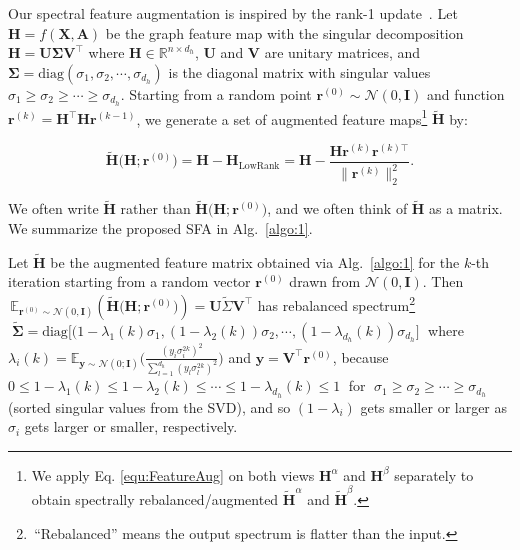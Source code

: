 Our spectral feature augmentation is inspired by the rank-1 update~\cite{yu2020toward}. %
Let  $\mathbf{H} = f(\mathbf{X}, \mathbf{A})$ be the graph feature map with the singular decomposition  $\mathbf{H} = \mathbf{U}\mathbf{\Sigma}\mathbf{V}^\top$ where $\mathbf{H} \in \mathbb{R}^{n \times d_h}$,  $\mathbf{U}$ and $\mathbf{V}$ are unitary matrices, and $\mathbf{\Sigma} = \text{diag}(\sigma_1, \sigma_2,\cdots, \sigma_{d_h})$ is the diagonal matrix with  singular values $\sigma_1 \geq \sigma_2 \geq \cdots \geq \sigma_{d_h}$.
Starting from a random point $\mathbf{r}^{(0)} \sim \mathcal{N}(0,\mathbf{I})$ and  function $\mathbf{r}^{(k)} = \mathbf{H}^\top \mathbf{H} \mathbf{r}^{(k-1)}$,
we generate a set of augmented feature maps\footnote{We apply Eq. \eqref{equ:FeatureAug} on both views $\mathbf{H}^\alpha$ and $\mathbf{H}^\beta$ separately to obtain spectrally rebalanced/augmented  $\widetilde{\mathbf{H}}^\alpha$ and $\widetilde{\mathbf{H}}^\beta$.} $\widetilde{\mathbf{H}}$ by:
%

\vspace{-0.4cm}
\begin{equation}
\label{equ:FeatureAug}
    \widetilde{\mathbf{H}}\big(\mathbf{H}; \mathbf{r}^{(0)}\big) =\mathbf{H} - \mathbf{H}_{\text{LowRank}} =  \mathbf{H} - \frac{\mathbf{H} \mathbf{r}^{(k)} \mathbf{r}^{(k)\top}}{\|\mathbf{r}^{(k)}\|_2^2}.
\end{equation}
\vspace{-0.2cm}
%

\noindent 
We often write $\widetilde{\mathbf{H}}$ rather than $\widetilde{\mathbf{H}}\big(\mathbf{H}; \mathbf{r}^{(0)}\big)$, and we often think of  $\widetilde{\mathbf{H}}$ as a matrix. We summarize the proposed SFA in Alg.~\ref{algo:1}.
\begin{proposition}
\label{prop:FeatureAug}
Let $\widetilde{\mathbf{H}}$ be the augmented feature matrix obtained via Alg.~\ref{algo:1} for the $k$-th iteration starting from a random vector $\mathbf{r}^{(0)}$ drawn from $\mathcal{N}(0,\mathbf{I})$. Then $\,\mathbb{E}_{\mathbf{r}^{(0)}\sim \mathcal{N}(0,\mathbf{I})} (\widetilde{\mathbf{H}}\big(\mathbf{H}; \mathbf{r}^{(0)}\big))=\mathbf{U} \widetilde{\Sigma} \mathbf{V}^{\top}\!$ has rebalanced spectrum\footnote{$\,$``Rebalanced'' means the output spectrum is flatter than the input.$\!\!\!\!$} $\;\widetilde{\boldsymbol{\Sigma}} = \text{diag}\big[(1-\lambda_1(k)\sigma_1, (1-\lambda_2(k))\sigma_2, \cdots, (1-\lambda_{d_h}(k))\sigma_{d_h}\big]\;$ where $\lambda_i(k)=\mathbb{E}_{\mathbf{y}\sim\mathcal{N}(0;\mathbf{I})}\big(\frac{\left(y_{i} \sigma_{i}^{2k}\right)^{2}}{ \sum_{l=1}^{d_h}\left(y_{l} \sigma_{l}^{2k}\right)^{2}})$ and $\mathbf{y} = \mathbf{V}^{\top}\mathbf{r}^{(0)}$, because $0\leq 1-\lambda_1(k) \leq 1-\lambda_2(k) \leq \cdots \leq 1-\lambda_{d_h}(k)\leq 1\;$ for $\;\sigma_1 \geq \sigma_2 \geq \cdots \geq \sigma_{d_h}$ (sorted singular values from the SVD), and so $(1-\lambda_i)$ gets smaller or larger  as $\sigma_i$ gets larger or smaller, respectively.
\end{proposition}

